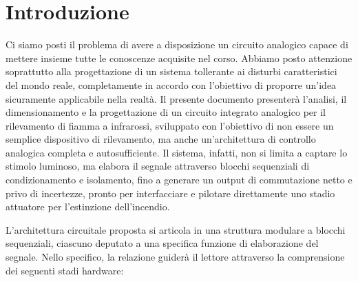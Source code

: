 \documentclass[12pt,a4paper]{article}
\begin{document}
\newpage
{} %
\tableofcontents
\newpage

\section{Introduzione}
    Ci siamo posti il problema di avere a disposizione un circuito analogico capace di mettere insieme tutte
    le conoscenze acquisite nel corso. Abbiamo posto attenzione soprattutto alla progettazione di un sistema
    tollerante ai disturbi caratteristici del mondo reale, completamente in accordo con l'obiettivo di proporre
    un'idea sicuramente applicabile nella realtà. Il presente documento presenterà l'analisi, il dimensionamento
    e la progettazione di un circuito integrato analogico per il rilevamento di fiamma a infrarossi, sviluppato
    con l'obiettivo di non essere un semplice dispositivo di rilevamento, ma anche un'architettura di controllo
    analogica completa e autosufficiente. Il sistema, infatti, non si limita a captare lo stimolo luminoso, ma
    elabora il segnale attraverso blocchi sequenziali di condizionamento e isolamento, fino a generare un output
    di commutazione netto e privo di incertezze, pronto per interfacciare e pilotare direttamente uno stadio attuatore
    per l'estinzione dell'incendio.

    L'architettura circuitale proposta si articola in una struttura modulare a blocchi sequenziali,
    ciascuno deputato a una specifica funzione di elaborazione del segnale. Nello specifico, la
    relazione guiderà il lettore attraverso la comprensione dei seguenti stadi hardware:
\end{document}
